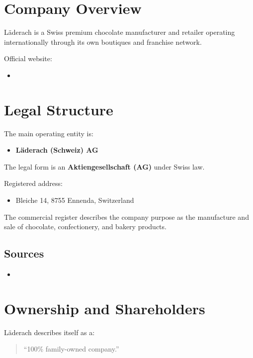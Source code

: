 \section{Company Overview}

Läderach is a Swiss premium chocolate manufacturer and retailer operating internationally through its own boutiques and franchise network.

Official website:
\begin{itemize}
    \item \cite{laderachOfficialWebsite}
\end{itemize}

\section{Legal Structure}

The main operating entity is:

\begin{itemize}
    \item \textbf{Läderach (Schweiz) AG}
\end{itemize}

The legal form is an \textbf{Aktiengesellschaft (AG)} under Swiss law.

Registered address:
\begin{itemize}
    \item Bleiche 14, 8755 Ennenda, Switzerland
\end{itemize}

The commercial register describes the company purpose as the manufacture and sale of chocolate, confectionery, and bakery products.

\subsection*{Sources}

\begin{itemize}
    \item \cite{moneyhouseLaederachSchweizAG}
\end{itemize}

\section{Ownership and Shareholders}

Läderach describes itself as a:

\begin{quote}
``100\% family-owned company.''
\end{quote}

